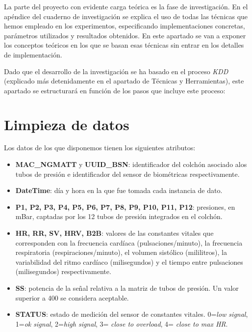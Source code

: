 
La parte del proyecto con evidente carga teórica es la fase de investigación. En el apéndice del cuaderno de investigación se explica el uso de todas las técnicas que hemos empleado en los experimentos, especificando implementaciones concretas, parámetros utilizados y resultados obtenidos. En este apartado se van a exponer los conceptos teóricos en los que se basan esas técnicas sin entrar en los detalles de implementación.  

Dado que el desarrollo de la investigación se ha basado en el proceso \textit{KDD} (explicado más detenidamente en el apartado de Técnicas y Herramientas), este apartado se estructurará en función de los pasos que incluye este proceso: 

\section{Limpieza de datos}

Los datos de los que disponemos tienen los siguientes atributos: 

\begin{itemize}
	\item \textbf{MAC\_NGMATT} y \textbf{UUID\_BSN}: identificador del colchón asociado alos tubos de presión e identificador del sensor de biométricas respectivamente. 
	\item \textbf{DateTime}: día y hora en la que fue tomada cada instancia de dato. 
	\item \textbf{P1, P2, P3, P4, P5, P6, P7, P8, P9, P10, P11, P12}: presiones, en mBar, captadas por los 12 tubos de presión integrados en el colchón. 
	\item \textbf{HR, RR, SV, HRV, B2B}: valores de las constantes vitales que corresponden con la frecuencia cardíaca (pulsaciones/minuto), la frecuencia respiratoria (respiraciones/minuto), el volumen sistólico (mililitros), la variabilidad del ritmo cardíaco (milisegundos) y el tiempo entre pulsaciones (milisegundos) respectivamente. 
	\item \textbf{SS}: potencia de la señal relativa a la matriz de tubos de presión. Un valor superior a 400 se considera aceptable. 
	\item \textbf{STATUS}: estado de medición del sensor de constantes vitales. 0=\textit{low signal}, 1=\textit{ok signal}, 2=\textit{high signal}, 3= \textit{close to overload}, 4= \textit{close to max HR}. 
\end{itemize}

